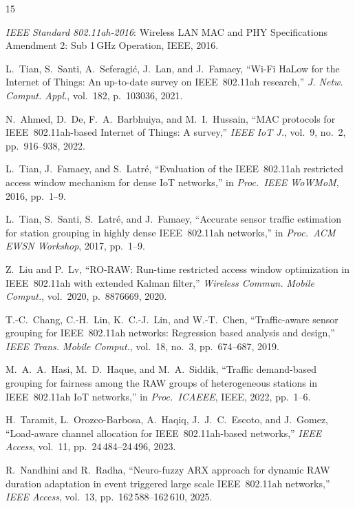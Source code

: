 \documentclass[conference]{IEEEtran}
\begin{document}
\balance
\begin{thebibliography}{15}

\textit{IEEE Standard 802.11ah-2016}: Wireless LAN MAC and PHY
Specifications Amendment 2: Sub 1\,GHz Operation, IEEE, 2016.

L.~Tian, S.~Santi, A.~Seferagi\'{c}, J.~Lan, and J.~Famaey,
``Wi-Fi HaLow for the Internet of Things: An up-to-date survey on
IEEE~802.11ah research,''
\textit{J. Netw. Comput. Appl.}, vol.~182, p.~103036, 2021.

N.~Ahmed, D.~De, F.~A.~Barbhuiya, and M.~I.~Hussain,
``MAC protocols for IEEE~802.11ah-based Internet of Things: A survey,''
\textit{IEEE IoT J.}, vol.~9, no.~2, pp.~916--938, 2022.

L.~Tian, J.~Famaey, and S.~Latr\'{e},
``Evaluation of the IEEE~802.11ah restricted access window mechanism
for dense IoT networks,''
in \textit{Proc.\ IEEE WoWMoM}, 2016, pp.~1--9.

L.~Tian, S.~Santi, S.~Latr\'{e}, and J.~Famaey,
``Accurate sensor traffic estimation for station grouping in highly
dense IEEE~802.11ah networks,''
in \textit{Proc.\ ACM EWSN Workshop}, 2017, pp.~1--9.

Z.~Liu and P.~Lv,
``RO-RAW: Run-time restricted access window optimization in
IEEE~802.11ah with extended Kalman filter,''
\textit{Wireless Commun. Mobile Comput.}, vol.~2020, p.~8876669, 2020.

T.-C.~Chang, C.-H.~Lin, K.~C.-J.~Lin, and W.-T.~Chen,
``Traffic-aware sensor grouping for IEEE~802.11ah networks: Regression
based analysis and design,''
\textit{IEEE Trans. Mobile Comput.}, vol.~18, no.~3, pp.~674--687, 2019.

M.~A.~A.~Hasi, M.~D.~Haque, and M.~A.~Siddik,
``Traffic demand-based grouping for fairness among the RAW groups of
heterogeneous stations in IEEE~802.11ah IoT networks,''
in \textit{Proc.\ ICAEEE}, IEEE, 2022, pp.~1--6.

H.~Taramit, L.~Orozco-Barbosa, A.~Haqiq, J.~J.~C.~Escoto, and J.~Gomez,
``Load-aware channel allocation for IEEE~802.11ah-based networks,''
\textit{IEEE Access}, vol.~11, pp.~24\,484--24\,496, 2023.

R.~Nandhini and R.~Radha,
``Neuro-fuzzy ARX approach for dynamic RAW duration adaptation in
event triggered large scale IEEE~802.11ah networks,''
\textit{IEEE Access}, vol.~13, pp.~162\,588--162\,610, 2025.


\end{thebibliography}
\end{document}

